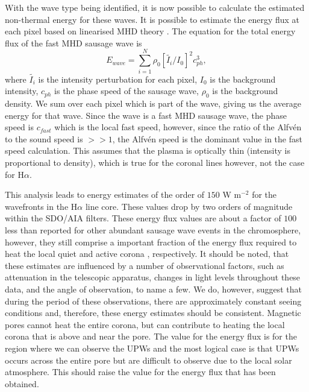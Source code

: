 	With the wave type being identified, it is now possible to calculate the estimated non-thermal energy for these waves.
	It is possible to estimate the energy flux at each pixel based on linearised MHD theory \citep[e.g.][]{Kitagawa2010}.
	The equation for the total energy flux of the fast MHD sausage wave is
	\begin{equation}
		E_{wave} = \sum\limits_{i = 1}^{N}\rho_{0}[\tilde{I_{i}}/I_{0}]^{2}c_{ph}^{3},
		\label{energy}
	\end{equation}
	where $\tilde{I_{i}}$ is the intensity perturbation for each pixel, $I_{0}$ is the background intensity, $c_{ph}$ is the phase speed of the sausage wave, $\rho_{0}$ is the background density.
	We sum over each pixel which is part of the wave, giving us the average energy for that wave.
	Since the wave is a fast MHD sausage wave, the phase speed is $c_{fast}$ which is the local fast speed, however, since the ratio of the Alfv{\'e}n to the sound speed is $>>1$, the Alfv{\'e}n speed is the dominant value in the fast speed calculation.
	This assumes that the plasma is optically thin (intensity is proportional to density), which is true for the coronal lines however, not the case for H$\alpha$.

	This analysis leads to energy estimates of the order of $150$ W m$^{-2}$ for the wavefronts in the H$\alpha$ line core.
	These values drop by two orders of magnitude within the SDO/AIA filters.
	These energy flux values are about a factor of $100$ less than reported for other abundant sausage wave events in the chromosphere\citep{Morton2012}, however, they still comprise a important fraction of the energy flux required to heat the local quiet \citep{Wedemeyer2012} and active corona \citep{Aschwanden2007}, respectively.
	It should be noted, that these estimates are influenced by a number of observational factors, such as attenuation in the telescopic apparatus, changes in light levels throughout these data, and the angle of observation, to name a few.
	We do, however, suggest that during the period of these observations, there are approximately constant seeing conditions and, therefore, these energy estimates should be consistent.
	Magnetic pores cannot heat the entire corona, but can contribute to heating the local corona that is above and near the pore.
	The value for the energy flux is for the region where we can observe the UPWs and the most logical case is that UPWs occurs across the entire pore but are difficult to observe due to the local solar atmosphere.
	This should raise the value for the energy flux that has been obtained.

